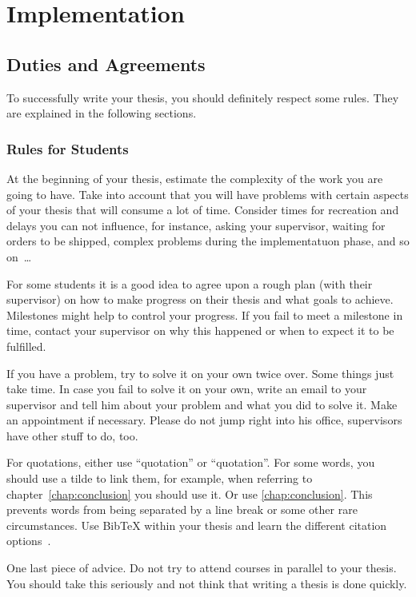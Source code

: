 \chapter{Implementation} \label{chap:impl}

\section{Duties and Agreements}

To successfully write your thesis, you should definitely respect some rules. They are explained in the following sections.

\subsection{Rules for Students}
At the beginning of your thesis, estimate the complexity of the work you are going to have. Take into account that you will have problems with certain aspects of your thesis that will consume a lot of time. Consider times for recreation and delays you can not influence, for instance, asking your supervisor, waiting for orders to be shipped, complex problems during the implementatuon phase, and so on~\dots

For some students it is a good idea to agree upon a rough plan (with their supervisor) on how to make progress on their thesis and what goals to achieve. Milestones might help to control your progress. If you fail to meet a milestone in time, contact your supervisor on why this happened or when to expect it to be fulfilled.

If you have a problem, try to solve it on your own twice over. Some things just take time. In case you fail to solve it on your own, write an email to your supervisor and tell him about your problem and what you did to solve it. Make an appointment if necessary. Please do not jump right into his office, supervisors have other stuff to do, too.

For quotations, either use ``quotation'' or \enquote{quotation}. For some words, you should use a tilde to link them, for example, when referring to chapter~\ref{chap:conclusion} you should use it. Or use \autoref{chap:conclusion}. This prevents words from being separated by a line break or some other rare circumstances. Use BibTeX within your thesis and learn the different citation options~\cite{Xie:2008:SBS,Newsome:05:DTA}.

One last piece of advice. Do not try to attend courses in parallel to your thesis. You should take this seriously and not think that writing a thesis is done quickly.

